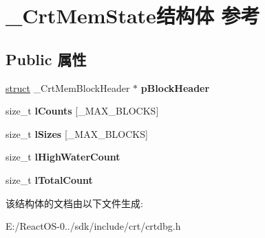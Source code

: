 \hypertarget{struct___crt_mem_state}{}\section{\+\_\+\+Crt\+Mem\+State结构体 参考}
\label{struct___crt_mem_state}
\subsection*{Public 属性}
\begin{DoxyCompactItemize}
\item 
\mbox{\label{struct___crt_mem_state_a01f437b2c1a783960450e4afb322e908}} 
\hyperlink{interfacestruct}{struct} \+\_\+\+Crt\+Mem\+Block\+Header $\ast$ {\bfseries p\+Block\+Header}
\item 
\mbox{\label{struct___crt_mem_state_aa7e855b8ef8f2696f20a38b5a9ad17b9}} 
size\+\_\+t {\bfseries l\+Counts} \mbox{[}\+\_\+\+M\+A\+X\+\_\+\+B\+L\+O\+C\+KS\mbox{]}
\item 
\mbox{\label{struct___crt_mem_state_a12850c4018ea9d8076616b594dcfb641}} 
size\+\_\+t {\bfseries l\+Sizes} \mbox{[}\+\_\+\+M\+A\+X\+\_\+\+B\+L\+O\+C\+KS\mbox{]}
\item 
\mbox{\label{struct___crt_mem_state_a1506c00e557811c79212520a1fed1fc8}} 
size\+\_\+t {\bfseries l\+High\+Water\+Count}
\item 
\mbox{\label{struct___crt_mem_state_a15e5a4e001616722699985ea20088c7a}} 
size\+\_\+t {\bfseries l\+Total\+Count}
\end{DoxyCompactItemize}


该结构体的文档由以下文件生成\+:\begin{DoxyCompactItemize}
\item 
E\+:/\+React\+O\+S-\/0../sdk/include/crt/crtdbg.\+h\end{DoxyCompactItemize}
